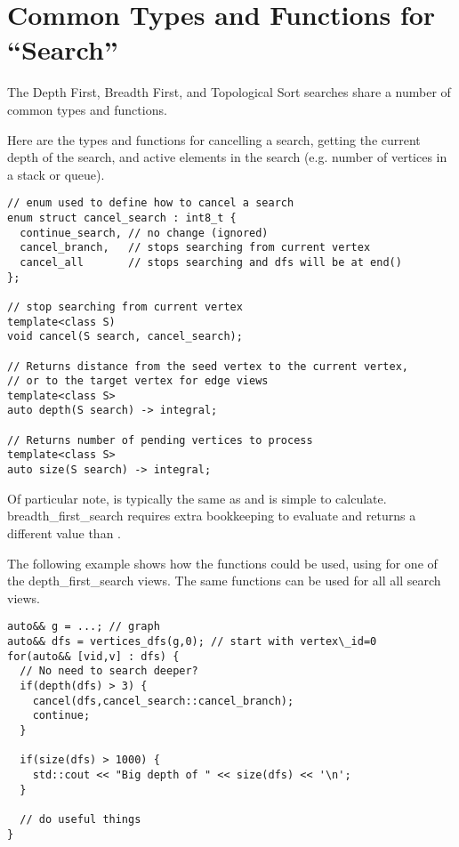 \section{Common Types and Functions for ``Search'' }

The Depth First, Breadth First, and Topological Sort searches share a number of common types and functions. 

Here are the types and functions for cancelling a search, getting the current depth of the search, and active elements in the search (e.g. number of vertices in a stack or queue).
\begin{lstlisting}
// enum used to define how to cancel a search
enum struct cancel_search : int8_t { 
  continue_search, // no change (ignored)
  cancel_branch,   // stops searching from current vertex
  cancel_all       // stops searching and dfs will be at end()
};

// stop searching from current vertex
template<class S)
void cancel(S search, cancel_search);

// Returns distance from the seed vertex to the current vertex, 
// or to the target vertex for edge views
template<class S>
auto depth(S search) -> integral;

// Returns number of pending vertices to process
template<class S>
auto size(S search) -> integral; 
\end{lstlisting}

Of particular note,  is typically the same as  and is simple to calculate. breadth\_first\_search requires extra bookkeeping to evaluate  and returns a different value than .

The following example shows how the functions  could be used, using  for one of the depth\_first\_search views. The same functions can be used for all all search views.
\begin{lstlisting}
auto&& g = ...; // graph
auto&& dfs = vertices_dfs(g,0); // start with vertex\_id=0
for(auto&& [vid,v] : dfs) {
  // No need to search deeper?
  if(depth(dfs) > 3) {
    cancel(dfs,cancel_search::cancel_branch);
    continue;
  }
  
  if(size(dfs) > 1000) {
    std::cout << "Big depth of " << size(dfs) << '\n';
  }
  
  // do useful things
}

\end{lstlisting}

